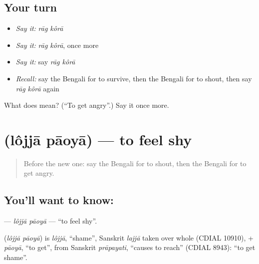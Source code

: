 \subsection*{Your turn}
\begin{itemize}
\raggedright
  \item \emph{Say it:} \emph{rāg kôrā}
  \item \emph{Say it:} \emph{rāg kôrā}, once more
  \item \emph{Say it:} say \emph{rāg kôrā}
  \item \emph{Recall:} say the Bengali for to survive, then the Bengali for to shout, then say \emph{rāg kôrā} again
\end{itemize}

\begin{tcolorbox}[breakable,colback=teal!4,colframe=teal!35!black,title={Before you move on}]
What does   mean? (\textquotedblleft{}To get angry\textquotedblright{}.) Say it once more.
\end{tcolorbox}
\section[\texorpdfstring{\bn{লজ্জা} \bn{পাওয়া} (lôjjā pāoyā)}{লজ্জা পাওয়া (lôjjā pāoyā)}]{  (lôjjā pāoyā) — to feel shy}

\label{lesson:BN-C211-lojja-paoya}



\begin{quote}
Before the new one: say the Bengali for to shout, then the Bengali for to get angry.
\end{quote}

\subsection*{You'll want to know:  }
\textbf{ } — \emph{lôjjā pāoyā} — \textquotedblleft{}to feel shy\textquotedblright{}.

\begin{cousinweb}
\textbf{ } (\emph{lôjjā pāoyā}) is \emph{lôjjā}, \textquotedblleft{}shame\textquotedblright{}, Sanskrit \emph{lajjā} taken over whole (CDIAL 10910), + \emph{pāoyā}, \textquotedblleft{}to get\textquotedblright{}, from Sanskrit \emph{prāpayati}, \textquotedblleft{}causes to reach\textquotedblright{} (CDIAL 8943): \textquotedblleft{}to get shame\textquotedblright{}.
\end{cousinweb}

